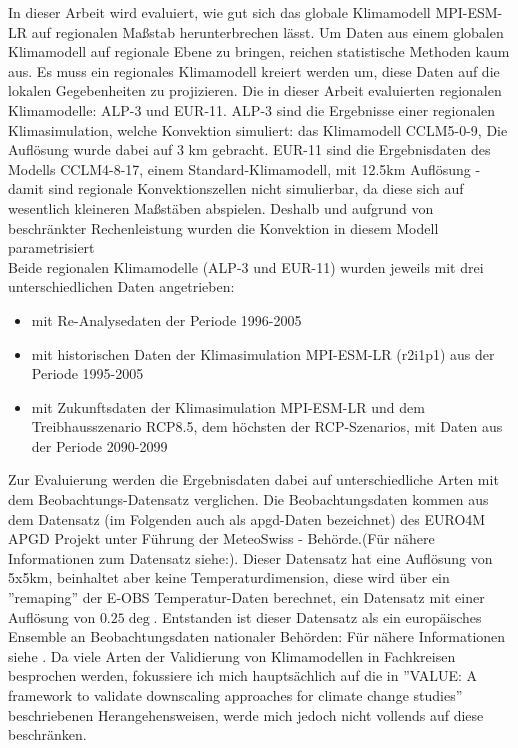 In dieser Arbeit wird evaluiert, wie gut sich das globale Klimamodell MPI-ESM-LR \cite{mpi-esm-lr} auf regionalen Maßstab herunterbrechen lässt. 
Um Daten aus einem globalen Klimamodell auf regionale Ebene zu bringen, reichen statistische Methoden kaum aus. Es muss ein regionales Klimamodell kreiert werden um, diese Daten auf die lokalen Gegebenheiten zu projizieren. Die in dieser Arbeit evaluierten regionalen Klimamodelle: ALP-3 und EUR-11. ALP-3 sind  die Ergebnisse einer regionalen Klimasimulation, welche Konvektion simuliert: das Klimamodell CCLM5-0-9, Die Auflösung wurde dabei auf 3 km gebracht. EUR-11 sind die Ergebnisdaten des Modells CCLM4-8-17, einem Standard-Klimamodell, mit 12.5km Auflösung - damit sind regionale Konvektionszellen nicht simulierbar, da diese sich auf wesentlich kleineren Maßstäben abspielen. Deshalb und aufgrund von beschränkter Rechenleistung wurden die Konvektion in diesem Modell parametrisiert\\
Beide regionalen Klimamodelle (ALP-3 und EUR-11) wurden jeweils mit drei unterschiedlichen Daten angetrieben: 
\begin{itemize}
	\item mit Re-Analysedaten der Periode 1996-2005
	\item mit historischen Daten der Klimasimulation MPI-ESM-LR (r2i1p1) aus der Periode 1995-2005
	\item mit Zukunftsdaten der Klimasimulation MPI-ESM-LR und dem Treibhausszenario RCP8.5, dem höchsten der RCP-Szenarios, mit Daten aus der Periode 2090-2099
\end{itemize}
Zur Evaluierung werden die Ergebnisdaten dabei auf unterschiedliche Arten mit dem Beobachtungs-Datensatz verglichen. Die Beobachtungsdaten kommen aus dem Datensatz (im Folgenden auch als apgd-Daten bezeichnet) des EURO4M APGD Projekt unter Führung der MeteoSwiss - Behörde\cite{meteoswiss}.(Für nähere Informationen zum Datensatz siehe:\cite{apgd}). Dieser Datensatz hat eine Auflösung von 5x5km, beinhaltet aber keine Temperaturdimension, diese wird über ein ''remaping'' der E-OBS Temperatur-Daten berechnet, ein Datensatz mit einer Auflösung von $0.25\deg$. Entstanden ist dieser Datensatz als ein europäisches Ensemble an Beobachtungsdaten nationaler Behörden: Für nähere Informationen siehe \cite{eobs}.
Da viele Arten der Validierung von Klimamodellen in Fachkreisen besprochen werden, fokussiere ich mich hauptsächlich auf die in ''VALUE: A framework to validate downscaling approaches for climate change studies'' \cite{maraun_value} beschriebenen Herangehensweisen, werde mich jedoch nicht vollends auf diese beschränken.